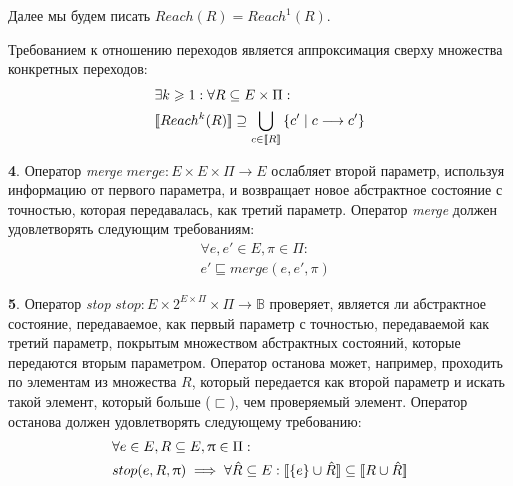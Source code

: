Далее мы будем писать $Reach(R) = Reach^1(R)$. 

Требованием к отношению переходов является аппроксимация сверху множества конкретных переходов:
\begin{equation}
\label{cpa_transfer_eq}
\begin{aligned}
& \exists k \geqslant 1: \forall R \subseteq E \times \Pi:\\
& [\![ Reach^k(R) ]\!] \supseteq \bigcup_{c \in [\![ R ]\!]}{\{c' \mid c \longrightarrow c'\}} \\
\end{aligned}
\end{equation}


{\textbf 4.} Оператор \emph{merge} $merge: E \times E \times \Pi \rightarrow E$ ослабляет второй параметр, используя информацию от первого параметра, и возвращает новое абстрактное состояние с точностью, которая передавалась, как третий параметр.
Оператор \emph{merge} должен удовлетворять следующим требованиям:
\begin{equation}
\label{cpa_merge_eq}
\begin{aligned}
&\forall e, e' \in E, \pi \in \Pi :\\
&e' \sqsubseteq merge(e, e', \pi)
\end{aligned}
\end{equation}

{\textbf 5.} Оператор \emph{stop} $stop: E \times 2^{E \times \Pi} \times \Pi \rightarrow \mathbb{B}$ проверяет, является ли абстрактное состояние, передаваемое, как первый параметр с точностью, передаваемой как третий параметр, покрытым множеством абстрактных состояний, которые передаются вторым параметром.
Оператор останова может, например, проходить по элементам из множества $R$, который передается как второй параметр и искать такой элемент, который больше ($\sqsubset$), чем проверяемый элемент.
Оператор останова должен удовлетворять следующему требованию:
\begin{equation}
\label{cpa_stop_eq}
\begin{aligned}
&\forall e \in E, R \subseteq E, \uppi \in \Pi:\\
&stop(e, R, \uppi) \implies\forall \hat R \subseteq E: [\![ \{e\}\cup \hat R ]\!] \subseteq [\![ R \cup \hat R ]\!]
\end{aligned}
\end{equation}

